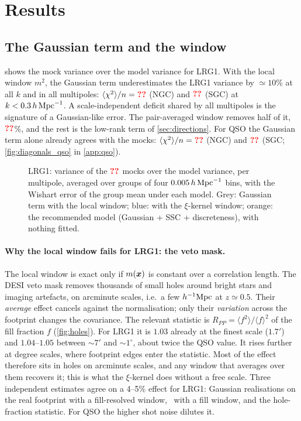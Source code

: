 \section{Results}
\label{sec:results}

\subsection{The Gaussian term and the window}
\label{sec:gauss}

 shows the mock variance over the model variance for LRG1. With the local window $m^2$, the Gaussian term underestimates the LRG1 variance by $\simeq10$\% at all $k$ and in all multipoles: $\langle\chi^2\rangle/n=\val{trace/LRG1/NGC/G_local/0.3}$ (NGC) and $\val{trace/LRG1/SGC/G_local/0.3}$ (SGC) at $k<0.3\,h\,\mathrm{Mpc}^{-1}$. A scale-independent deficit shared by all multipoles is the signature of a Gaussian-like error. The pair-averaged window removes half of it, $\val{kernelgain/LRG1/NGC}$\%, and the rest is the low-rank term of \cref{sec:directions}. For QSO the Gaussian term alone already agrees with the mocks: $\langle\chi^2\rangle/n=\val{trace/QSO/NGC/G/0.3}$ (NGC) and $\val{trace/QSO/SGC/G/0.3}$ (SGC; \cref{fig:diagonals_qso} in \cref{app:qso}).

\begin{figure}
  \centering{}
  \caption{LRG1: variance of the $\val{Nclean}$ mocks over the model variance, per multipole, averaged over groups of four $0.005\,h\,\mathrm{Mpc}^{-1}$ bins, with the Wishart error of the group mean under each model. Grey: Gaussian term with the local window; blue: with the $\xi$-kernel window; orange: the recommended model (Gaussian + SSC + discreteness), with nothing fitted.}
  \label{fig:diagonals}
\end{figure}

\paragraph{Why the local window fails for LRG1: the veto mask.} The local window is exact only if $m(\boldsymbol{x})$ is constant over a correlation length. The DESI veto mask removes thousands of small holes around bright stars and imaging artefacts, on arcminute scales, i.e.\ a few $h^{-1}\mathrm{Mpc}$ at $z\simeq0.5$. Their \emph{average} effect cancels against the normalisation; only their \emph{variation} across the footprint changes the covariance. The relevant statistic is $R_{PP}=\langle f^2\rangle/\langle f\rangle^2$ of the fill fraction $f$ (\cref{fig:holes}). For LRG1 it is $1.03$ already at the finest scale ($1.7'$) and $1.04$--$1.05$ between $\sim7'$ and $\sim1^\circ$, about twice the QSO value. It rises further at degree scales, where footprint edges enter the statistic. Most of the effect therefore sits in holes on arcminute scales, and any window that averages over them recovers it; this is what the $\xi$-kernel does without a free scale. Three independent estimates agree on a 4--5\% effect for LRG1: Gaussian realisations on the real footprint with a fill-resolved window, \thecov\ with a fill window, and the hole-fraction statistic. For QSO the higher shot noise dilutes it.

